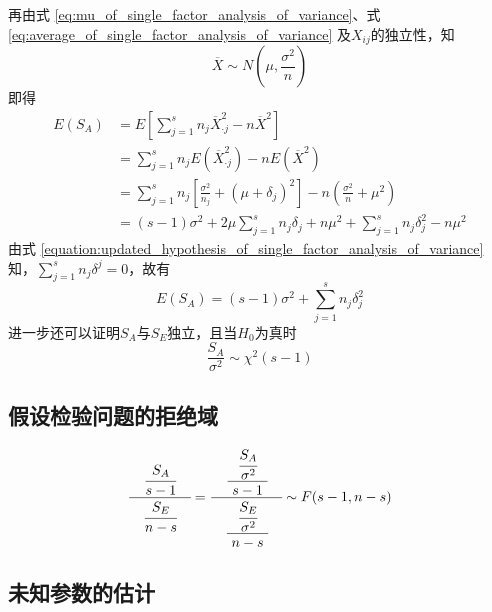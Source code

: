 再由式 \ref{eq:mu_of_single_factor_analysis_of_variance}、式 \ref{eq:average_of_single_factor_analysis_of_variance} 及$ X_{ij} $的独立性，知
\begin{equation}
	\overline{X} \sim N\left( \mu, \frac{\sigma^2}{n}\right) 
\end{equation}
即得
\begin{equation}
	\begin{aligned}
		E\left( S_A\right) &= E\left[ \sum_{j=1}^{s}n_j\overline{X}_{\cdot j}^{2} - n\overline{X}^2 \right] \\
		&= \sum_{j=1}^{s}n_jE\left( \overline{X}_{\cdot j}^2\right)  - nE\left( \overline{X}^2\right) \\
		&= \sum_{j=1}^{s}n_j\left[ \frac{\sigma^2}{n_j} + \left( \mu + \delta_{j} \right)^2  \right] - n\left( \frac{\sigma^2}{n} + \mu^2 \right) \\
		&= \left( s-1 \right) \sigma^2 + 2\mu\sum_{j=1}^{s}n_{j}\delta_{j} + n\mu^2 + \sum_{j=1}^{s}n_{j}\delta_{j}^{2} - n\mu^2
	\end{aligned}
\end{equation}
由式 \ref{equation:updated_hypothesis_of_single_factor_analysis_of_variance} 知，$ \sum_{j=1}^{s}n_{j}\delta^{j} = 0 $，故有
\begin{equation}
	E\left( S_A \right) = \left( s-1 \right) \sigma^2 + \sum_{j=1}^{s}n_{j}\delta_{j}^{2}
\end{equation}
进一步还可以证明$ S_A $与$ S_E $独立，且当$ H_0 $为真时
\begin{equation}
	\frac{S_A}{\sigma^2} \sim \chi^2\left( s-1 \right) 
\end{equation}

\subsection{假设检验问题的拒绝域}

\begin{equation}
	\cfrac{\quad\cfrac{S_A}{s-1}\quad}{\quad\cfrac{S_E}{n-s}\quad} = 
	\cfrac{\quad \cfrac{\ \cfrac{S_A}{\sigma^2}\ }{\ s-1\ }\quad}{\quad \cfrac{\ \cfrac{S_E}{\sigma^2}\ }{\ n-s\ }\quad} \sim F(s-1, n-s)
\end{equation}

\subsection{未知参数的估计}


